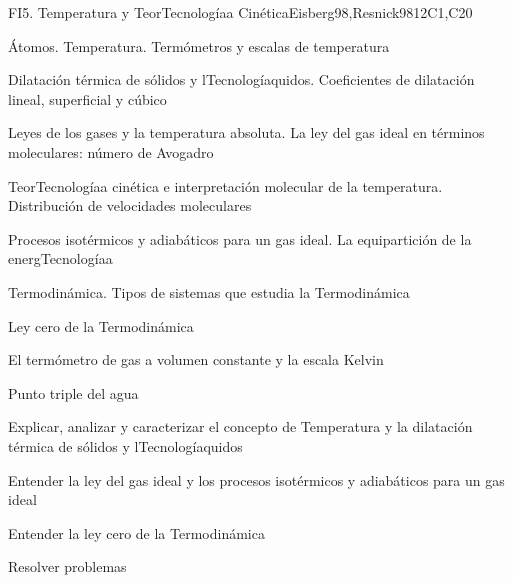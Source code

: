 \begin{syllabus}
\begin{unit}{FI5. Temperatura y TeorTecnologíaa Cinética}{Eisberg98,Resnick98}{}{12}{C1,C20}
\begin{topics}
         \item  Átomos. Temperatura. Termómetros y escalas de temperatura
	 \item  Dilatación térmica de sólidos y lTecnologíaquidos. Coeficientes de dilatación lineal, superficial y cúbico
         \item  Leyes de los gases y la temperatura absoluta. La ley del gas ideal en términos moleculares: número de Avogadro
	 \item  TeorTecnologíaa cinética e interpretación molecular de la temperatura. Distribución de velocidades moleculares
         \item  Procesos isotérmicos y adiabáticos para un gas ideal. La equipartición de la energTecnologíaa
	 \item  Termodinámica. Tipos de sistemas que estudia la Termodinámica
         \item  Ley cero de la Termodinámica
	 \item  El termómetro de gas a volumen constante y la escala Kelvin
         \item  Punto triple del agua
   \end{topics}

   \begin{learningoutcomes}
         \item  Explicar, analizar y caracterizar el concepto de Temperatura y la dilatación térmica de sólidos y lTecnologíaquidos
         \item  Entender la ley del gas ideal y los procesos isotérmicos y adiabáticos para un gas ideal
         \item  Entender la ley cero de la Termodinámica
         \item  Resolver problemas
   \end{learningoutcomes}
\end{unit}


\end{syllabus}
